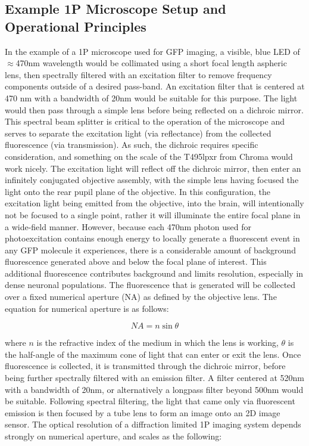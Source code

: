 \documentclass [PhD] {UCLAthesis}
\begin{document}
\subsection{Example 1P Microscope Setup and Operational Principles}
In the example of a 1P microscope used for GFP imaging, a visible, blue LED of $\approx$470nm wavelength would be collimated using a short focal length aspheric lens, then spectrally filtered with an excitation filter to remove frequency components outside of a desired pass-band. An excitation filter that is centered at 470 nm with a bandwidth of \textpm 20nm would be suitable for this purpose. The light would then pass through a simple lens  before being reflected on a dichroic mirror. This spectral beam splitter is critical to the operation of the microscope and serves to separate the excitation light (via reflectance) from the collected fluorescence (via transmission). As such, the dichroic requires specific consideration, and something on the scale of the T495lpxr from Chroma would work nicely. The excitation light will reflect off the dichroic mirror, then enter an infinitely conjugated objective assembly, with the simple lens having focused the light onto the rear pupil plane of the objective. In this configuration, the excitation light being emitted from the objective, into the brain, will intentionally not be focused to a single point, rather it will illuminate the entire focal plane in a wide-field manner. However, because each 470nm photon used for photoexcitation contains enough energy to locally generate a fluorescent event in any GFP molecule it experiences, there is a considerable amount of background fluorescence generated above and below the focal plane of interest. This additional fluorescence contributes background and limits resolution, especially in dense neuronal populations. The fluorescence that is generated will be collected over a fixed numerical aperture (NA) as defined by the objective lens. The equation for numerical aperture is as follows: 

\begin{equation}
NA = n \sin \theta
\end{equation}

\noindent where $n$ is the refractive index of the medium in which the lens is working, $\theta$ is the half-angle of the maximum cone of light that can enter or exit the lens. Once fluorescence is collected, it is transmitted through the dichroic mirror, before being further spectrally filtered with an emission filter. A filter centered at 520nm with a bandwidth of \textpm 20nm, or alternatively a longpass filter beyond 500nm would be suitable. Following spectral filtering, the light that came only via fluorescent emission is then focused by a tube lens to form an image onto an 2D image sensor. The optical resolution of a diffraction limited 1P imaging system depends strongly on numerical aperture, and scales as the following:
\end{document}
